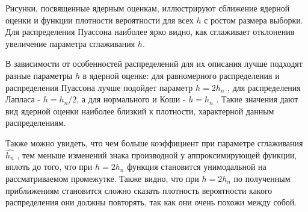 Рисунки, посвященные ядерным оценкам, иллюстрируют сближение ядерной оценки и функции плотности вероятности для всех $h$ с ростом размера выборки. Для распределения Пуассона наиболее ярко видно, как сглаживает отклонения увеличение параметра сглаживания $h$.


В зависимости от особенностей распределений для их описания лучше подходят разные параметры $h$ в ядерной оценке: для равномерного распределения и распределения Пуассона лучше подойдет параметр $h = 2h_n$ , для распределения Лапласа - $h = h_n /2$, а для нормального и Коши - $h = h_n$ . Такие значения дают вид ядерной оценки наиболее близкий к плотности, характерной данным распределениям.


Также можно увидеть, что чем больше коэффициент при параметре сглаживания $\hat{h_n}$ , тем меньше изменений знака производной у аппроксимирующей функции, вплоть до того, что при $h = 2h_n$ функция становится унимодальной на рассматриваемом промежутке. Также видно, что при $h = 2h_n$ по полученным приближениям становится сложно сказать плотность вероятности какого распределения они должны повторять, так как они очень похожи между собой.
